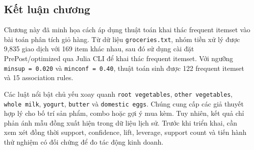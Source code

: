 \subsection{Kết luận chương}
\label{subsec:application-conclusion}

Chương này đã minh họa cách áp dụng thuật toán khai thác frequent itemset vào bài toán phân tích giỏ hàng. Từ dữ liệu \texttt{groceries.txt}, nhóm tiền xử lý được 9,835 giao dịch với 169 item khác nhau, sau đó sử dụng cài đặt PrePost/optimized qua Julia CLI để khai thác frequent itemset. Với ngưỡng \texttt{minsup = 0.020} và \texttt{minconf = 0.40}, thuật toán sinh được 122 frequent itemset và 15 association rules.

Các luật nổi bật chủ yếu xoay quanh
\texttt{root vegetables}, \texttt{other vegetables}, \texttt{whole milk},
\texttt{yogurt}, \texttt{butter} và \texttt{domestic eggs}. Chúng cung cấp các
giả thuyết hợp lý cho bố trí sản phẩm, combo hoặc gợi ý mua kèm. Tuy nhiên, kết
quả chỉ phản ánh mẫu đồng xuất hiện trong dữ liệu lịch sử. Trước khi triển khai,
cần xem xét đồng thời support, confidence, lift, leverage, support count và tiến
hành thử nghiệm có đối chứng để đo tác động kinh doanh.
